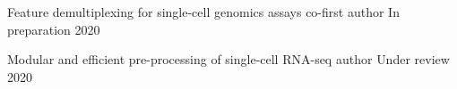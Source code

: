 

\begin{cvhonors}

  \cvhonor
    {Feature demultiplexing for single-cell genomics assays} %
    {co-first author} %
    {In preparation} %
    {2020} %


  \cvhonor
    {Modular and efficient pre-processing of single-cell RNA-seq} %
    {author} %
    {Under review} %
    {2020} %
\end{cvhonors}
